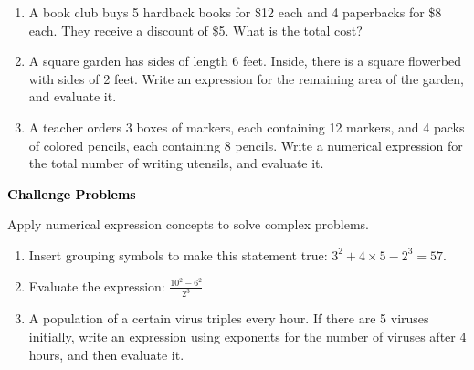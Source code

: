 \documentclass[12pt, letterpaper, fleqn]{article}
\begin{document}
\begin{enumerate}[itemsep=2.2cm, leftmargin=0.6cm]

\item A book club buys 5 hardback books for \$12 each and 4 paperbacks for \$8 each. They receive a discount of \$5. What is the total cost?

\vspace{2cm}

\item A square garden has sides of length 6 feet. Inside, there is a square flowerbed with sides of 2 feet. Write an expression for the remaining area of the garden, and evaluate it.

\vspace{2cm}

\item A teacher orders 3 boxes of markers, each containing 12 markers, and 4 packs of colored pencils, each containing 8 pencils. Write a numerical expression for the total number of writing utensils, and evaluate it.

\vspace{2cm}

\end{enumerate}

\newpage

\begin{tcolorbox}[colback=black!10]
\large\textcolor{black}{\textbf{Challenge Problems}}
\end{tcolorbox}

\noindent
Apply numerical expression concepts to solve complex problems.

\vspace{3mm}

\begin{enumerate}[itemsep=2.4cm, leftmargin=0.6cm]

\item Insert grouping symbols to make this statement true: $3^2 + 4 \times 5 - 2^3 = 57$.

\vspace{2.3cm}

\item Evaluate the expression: $\frac{10^2 - 6^2}{2^3}$

\vspace{2.3cm}

\item A population of a certain virus triples every hour. If there are 5 viruses initially, write an expression using exponents for the number of viruses after 4 hours, and then evaluate it.

\vspace{2.5cm}

\end{enumerate}
\end{document}
